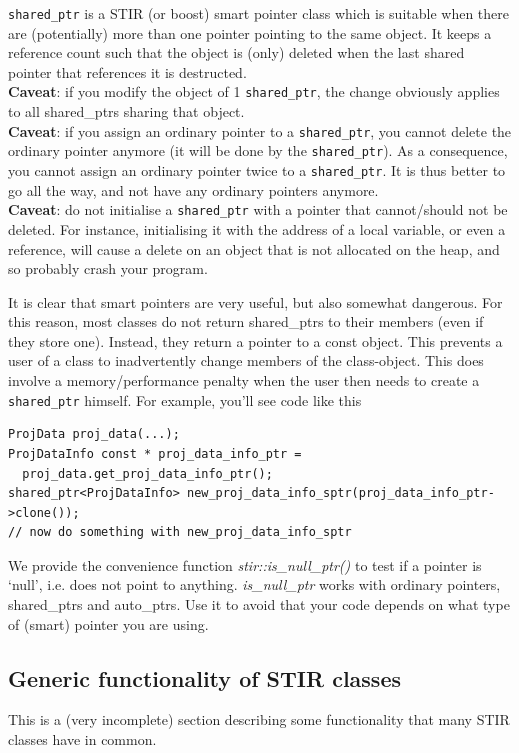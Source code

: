 \documentclass{article}
\begin{document}
\texttt{shared\_ptr} is a STIR (or boost) smart pointer class which 
is suitable when there are (potentially) more than one pointer 
pointing to the same object. It keeps a reference count such 
that the object is (only) deleted when the last shared pointer 
that references it is destructed. \\
\textbf{Caveat}: if you modify the object of 1 \texttt{shared\_ptr}, the change 
obviously applies to all shared\_ptrs sharing that object.\\
\textbf{Caveat}: if you assign an ordinary pointer to a \texttt{shared\_ptr}, you 
cannot delete the ordinary pointer anymore (it will be done by 
the \texttt{shared\_ptr}). As a consequence, you cannot assign an ordinary 
pointer twice to a \texttt{shared\_ptr}. It is thus better to go all the 
way, and not have any ordinary pointers anymore.\\
\textbf{Caveat}: do not initialise a \texttt{shared\_ptr} with a pointer that cannot/should 
not be deleted. For instance, initialising it with the address 
of a local variable, or even a reference, will cause a delete 
on an object that is not allocated on the heap, and so probably 
crash your program.

It is clear that smart pointers are very useful, but also somewhat 
dangerous. For this reason, most classes do not return shared\_ptrs 
to their members (even if they store one). Instead, they return 
a pointer to a const object. This prevents a user of a class 
to inadvertently change members of the class-object. This does 
involve a memory/performance penalty when the user then needs to create 
a \texttt{shared\_ptr} himself. For example, you'll see code like this

\begin{verbatim}
ProjData proj_data(...);
ProjDataInfo const * proj_data_info_ptr = 
  proj_data.get_proj_data_info_ptr();
shared_ptr<ProjDataInfo> new_proj_data_info_sptr(proj_data_info_ptr->clone());
// now do something with new_proj_data_info_sptr
\end{verbatim}


We provide the convenience function \textit{stir::is\_null\_ptr()} 
to test if a pointer is `null', i.e. does not point to anything. \textit{is\_null\_ptr} 
works with ordinary pointers, shared\_ptrs and auto\_ptrs. Use 
it to avoid that your code depends on what type of (smart) pointer 
you are using.

\subsection{Generic functionality of STIR classes}
This is a (very incomplete) section describing some functionality that
many STIR classes have in common.
\end{document}
